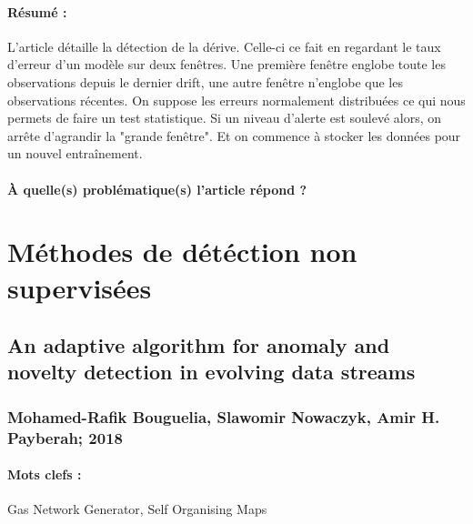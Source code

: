 \documentclass[11pt,a4paper]{report}
\begin{document}
\paragraph{Résumé :} L'article détaille la détection de la dérive. Celle-ci ce fait en regardant le taux d'erreur d'un modèle sur deux fenêtres. Une première fenêtre englobe toute les observations depuis le dernier drift, une autre fenêtre n'englobe que les observations récentes. On suppose les erreurs normalement distribuées ce qui nous permets de faire un test statistique. Si un niveau d'alerte est soulevé alors, on arrête d'agrandir la "grande fenêtre". Et on commence à stocker les données pour un nouvel entraînement.

\paragraph{À quelle(s) problématique(s) l'article répond ?} 


















\newpage



















\section{Méthodes de détéction non supervisées}

\subsection{An adaptive algorithm for anomaly and novelty detection in evolving data streams}
\subsubsection{Mohamed-Rafik Bouguelia, Slawomir Nowaczyk, Amir H. Payberah; 2018}

\paragraph{Mots clefs :}Gas Network Generator, Self Organising Maps
\end{document}
